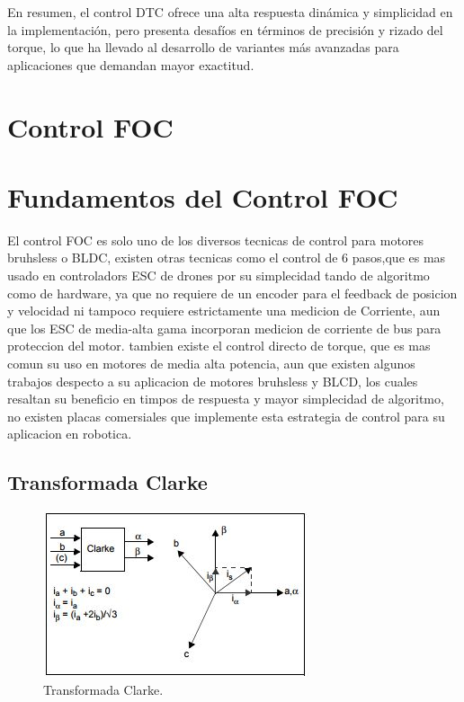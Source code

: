 \documentclass[11pt]{report}
\begin{document}
En resumen, el control DTC ofrece una alta respuesta dinámica y simplicidad en la implementación, pero presenta desafíos en términos de precisión y rizado del torque, lo que ha llevado al desarrollo de variantes más avanzadas para aplicaciones que demandan mayor exactitud.

\section{Control FOC}

\section{Fundamentos del Control FOC}

El control FOC es solo uno de los diversos tecnicas de control para motores bruhsless o BLDC, existen otras tecnicas como el control de 6 pasos,que es mas usado en controladors ESC de drones por su simplecidad tando de algoritmo como de hardware, ya que no requiere de un encoder para el feedback de posicion y velocidad ni tampoco requiere estrictamente una medicion de Corriente, aun que los ESC de media-alta gama incorporan medicion de corriente de bus para proteccion del motor. tambien existe el control directo de torque, que es mas comun su uso en motores de media alta potencia, aun que existen algunos trabajos despecto a su aplicacion de motores bruhsless y BLCD, los cuales resaltan su beneficio en timpos de respuesta y mayor simplecidad de algoritmo, no existen placas comersiales que implemente esta estrategia de control para su aplicacion en robotica.

\subsection{Transformada Clarke}
\begin{figure}[ht]
	\centering
	\includegraphics{imagenes/clarke.jpg}
	\caption{Transformada Clarke.}
\end{figure}
\FloatBarrier
\end{document}

